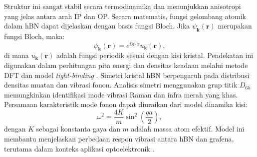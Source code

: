 Struktur ini sangat stabil secara termodinamika dan menunjukkan anisotropi yang jelas antara arah IP dan OP. Secara matematis, fungsi gelombang atomik dalam hBN dapat dijelaskan dengan basis fungsi Bloch. Jika \(\psi_{\mathbf{k}}(\mathbf{r})\) merupakan fungsi Bloch, maka:
\begin{equation}
    \psi_{\mathbf{k}}(\mathbf{r}) = e^{i\mathbf{k}\cdot\mathbf{r}} u_{\mathbf{k}}(\mathbf{r}),
\end{equation}
di mana \(u_{\mathbf{k}}(\mathbf{r})\) adalah fungsi periodik sesuai dengan kisi kristal. Pendekatan ini digunakan dalam perhitungan pita energi dan densitas keadaan melalui metode DFT dan model \emph{tight-binding} \citep{CastroNeto2009}.
Simetri kristal hBN berpengaruh pada distribusi densitas muatan dan vibrasi fonon. Analisis simetri menggunakan grup titik \(D_{6h}\) memungkinkan identifikasi mode vibrasi Raman dan infra merah yang khas. Persamaan karakteristik mode fonon dapat diuraikan dari model dinamika kisi:
\begin{equation}
    \omega^2 = \frac{4K}{m}\sin^2\left(\frac{qa}{2}\right),
\end{equation}
dengan \(K\) sebagai konstanta gaya dan \(m\) adalah massa atom efektif. Model ini membantu menjelaskan perbedaan respon vibrasi antara hBN dan grafena, terutama dalam konteks aplikasi optoelektronik \citep{Wang2017}.

